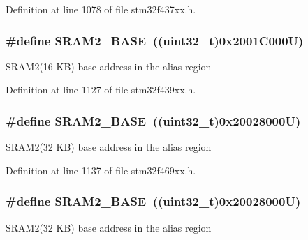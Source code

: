 Definition at line 1078 of file stm32f437xx.\+h.

\subsubsection[{\texorpdfstring{S\+R\+A\+M2\+\_\+\+B\+A\+SE}{SRAM2_BASE}}]{\setlength{\rightskip}{0pt plus 5cm}\#define S\+R\+A\+M2\+\_\+\+B\+A\+SE~((uint32\+\_\+t)0x2001\+C000\+U)}\hypertarget{group___peripheral__memory__map_gadbb42a3d0a8a90a79d2146e4014241b1}{}\label{group___peripheral__memory__map_gadbb42a3d0a8a90a79d2146e4014241b1}
S\+R\+A\+M2(16 K\+B) base address in the alias region 

Definition at line 1127 of file stm32f439xx.\+h.

\subsubsection[{\texorpdfstring{S\+R\+A\+M2\+\_\+\+B\+A\+SE}{SRAM2_BASE}}]{\setlength{\rightskip}{0pt plus 5cm}\#define S\+R\+A\+M2\+\_\+\+B\+A\+SE~((uint32\+\_\+t)0x20028000\+U)}\hypertarget{group___peripheral__memory__map_gadbb42a3d0a8a90a79d2146e4014241b1}{}\label{group___peripheral__memory__map_gadbb42a3d0a8a90a79d2146e4014241b1}
S\+R\+A\+M2(32 K\+B) base address in the alias region 

Definition at line 1137 of file stm32f469xx.\+h.

\subsubsection[{\texorpdfstring{S\+R\+A\+M2\+\_\+\+B\+A\+SE}{SRAM2_BASE}}]{\setlength{\rightskip}{0pt plus 5cm}\#define S\+R\+A\+M2\+\_\+\+B\+A\+SE~((uint32\+\_\+t)0x20028000\+U)}\hypertarget{group___peripheral__memory__map_gadbb42a3d0a8a90a79d2146e4014241b1}{}\label{group___peripheral__memory__map_gadbb42a3d0a8a90a79d2146e4014241b1}
S\+R\+A\+M2(32 K\+B) base address in the alias region 

